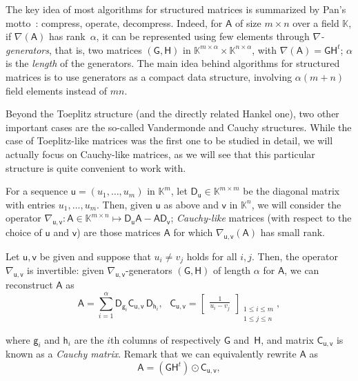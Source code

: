 \documentclass[sigconf]{acmart}
\newcommand{\vg}{\ensuremath{\mathsf{g}}}
\newcommand{\vh}{\ensuremath{\mathsf{h}}}
\newcommand{\vu}{\ensuremath{\mathsf{u}}}
\newcommand{\vv}{\ensuremath{\mathsf{v}}}
\newcommand{\mA}{\ensuremath{\mathsf{A}}}
\newcommand{\mC}{\ensuremath{\mathsf{C}}}
\newcommand{\mD}{\ensuremath{\mathsf{D}}}
\newcommand{\mG}{\ensuremath{\mathsf{G}}}
\newcommand{\mH}{\ensuremath{\mathsf{H}}}
\newcommand{\K}{\ensuremath{\mathbb{K}}}
\theoremstyle{acmdefinition}
\begin{document}
The key idea of most algorithms for structured matrices is summarized
by Pan's motto~\cite{Pan01}: compress, operate, decompress. Indeed,
for $\mA$ of size $m \times n$ over a field $\K$, if $\nabla(\mA)$ has
rank~$\alpha$, it can be represented using few elements through {\it
  $\nabla$-generators}, that is, two matrices $(\mG,\mH)$ in
$\K^{m\times \alpha} \times \K^{n\times \alpha}$, with $\nabla(\mA) =
\mG \mH^t$; $\alpha$ is the {\em length} of the generators. The main
idea behind algorithms for structured matrices is to use generators as
a compact data structure, involving $\alpha (m+n)$ field elements
instead of $mn$.

{}  Beyond the
Toeplitz structure (and the directly related Hankel one), two other
important cases are the so-called Vandermonde and Cauchy
structures. While the case of Toeplitz-like matrices was the first one
to be studied in detail, we will actually focus on Cauchy-like
matrices, as we will see that this particular structure is quite
convenient to work with.

For a sequence $\vu=(u_1,\dots,u_m)$ in $\K^m$, let $\mD_\vu \in
\K^{m\times m}$ be the diagonal matrix with entries
$u_1,\dots,u_m$. Then, given $\vu$ as above and $\vv$ in $\K^n$, we will
consider the operator $\nabla_{\vu,\vv}: \mA \in \K^{m\times n} \mapsto \mD_\vu
\mA - \mA \mD_\vv$; {\em Cauchy-like} matrices (with respect to the
choice of $\vu$ and $\vv$) are those matrices $\mA$ for which
$\nabla_{\vu,\vv}(\mA)$ has small rank.

Let $\vu,\vv$ be given and suppose that $u_i \ne v_j$ holds for all
$i,j$. Then, the operator $\nabla_{\vu,\vv}$ is invertible: given
$\nabla_{\vu,\vv}$-generators $(\mG,\mH)$ of length $\alpha$ for $\mA$, we can reconstruct $\mA$ as
\vspace{-5px}
\begin{equation}\label{eq:recA}
\mA = \sum_{i=1}^\alpha
\mD_{\vg_i} 
\mC_{\vu,\vv}\,\mD_{\vh_i},\ \ \ 
\mC_{\vu,\vv}=\begin{bmatrix}
\frac 1{u_i-v_j}
\end{bmatrix}_{\substack{1 \leq i \leq m\\1 \leq j \leq n}},
\end{equation}

\vspace{-5px}
{\noindent}where $\vg_i$ and $\vh_i$ are the $i$th columns of respectively $\mG$
and~$\mH$, and  matrix $\mC_{\vu,\vv}$ is known as a {\em Cauchy
  matrix}. Remark that we can
equivalently rewrite $\mA$ as
\vspace{-5px}
\begin{equation}\label{eq:recA2}
\mA= (\mG \mH^t) \odot \mC_{\vu,\vv},
\end{equation}
\end{document}

